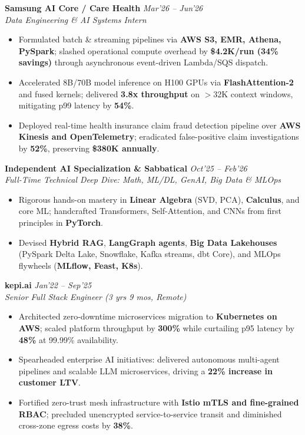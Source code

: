 \documentclass[10pt,a4paper]{article}
\begin{document}
\begin{minipage}[t]{0.488\textwidth}
    \noindent\textbf{Samsung AI Core / Care Health} \hfill {\footnotesize\textit{Mar'26 -- Jun'26}}\\
    \textit{Data Engineering \& AI Systems Intern}
    \begin{itemize}
        \item Formulated batch \& streaming pipelines via \textbf{AWS S3, EMR, Athena, PySpark}; slashed operational compute overhead by \textbf{\$4.2K/run (34\% savings)} through asynchronous event-driven Lambda/SQS dispatch.
        \item Accelerated 8B/70B model inference on H100 GPUs via \textbf{FlashAttention-2} and fused kernels; delivered \textbf{3.8x throughput} on $>$32K context windows, mitigating p99 latency by \textbf{54\%}.
        \item Deployed real-time health insurance claim fraud detection pipeline over \textbf{AWS Kinesis and OpenTelemetry}; eradicated false-positive claim investigations by \textbf{52\%}, preserving \textbf{\$380K annually}.
    \end{itemize}

    \noindent\textbf{Independent AI Specialization \& Sabbatical} \hfill {\footnotesize\textit{Oct'25 -- Feb'26}}\\
    \textit{Full-Time Technical Deep Dive: Math, ML/DL, GenAI, Big Data \& MLOps}
    \begin{itemize}
        \item Rigorous hands-on mastery in \textbf{Linear Algebra} (SVD, PCA), \textbf{Calculus}, and core ML; handcrafted Transformers, Self-Attention, and CNNs from first principles in \textbf{PyTorch}.
        \item Devised \textbf{Hybrid RAG}, \textbf{LangGraph agents}, \textbf{Big Data Lakehouses} (PySpark Delta Lake, Snowflake, Kafka streams, dbt Core), and MLOps flywheels (\textbf{MLflow, Feast, K8s}).
    \end{itemize}

    \noindent\textbf{kepi.ai} \hfill {\footnotesize\textit{Jan'22 -- Sep'25}}\\
    \textit{Senior Full Stack Engineer (3 yrs 9 mos, Remote)}
    \begin{itemize}
        \item Architected zero-downtime microservices migration to \textbf{Kubernetes on AWS}; scaled platform throughput by \textbf{300\%} while curtailing p95 latency by \textbf{48\%} at 99.99\% availability.
        \item Spearheaded enterprise AI initiatives: delivered autonomous multi-agent pipelines and scalable LLM microservices, driving a \textbf{22\% increase in customer LTV}.
        \item Fortified zero-trust mesh infrastructure with \textbf{Istio mTLS and fine-grained RBAC}; precluded unencrypted service-to-service transit and diminished cross-zone egress costs by \textbf{38\%}.
    \end{itemize}


\end{minipage}
\end{document}
